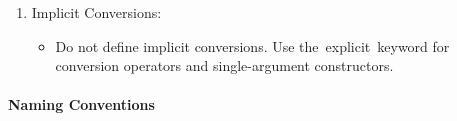 \begin{enumerate}
	\item Implicit Conversions:
	\begin{itemize}
		\item Do not define implicit conversions. Use the explicit keyword for conversion operators and single-argument constructors.
	\end{itemize}
	
\end{enumerate}

\paragraph{Naming Conventions}

\inputminted{cpp}{src/style-and-guidelines/naming/naming.cpp}

